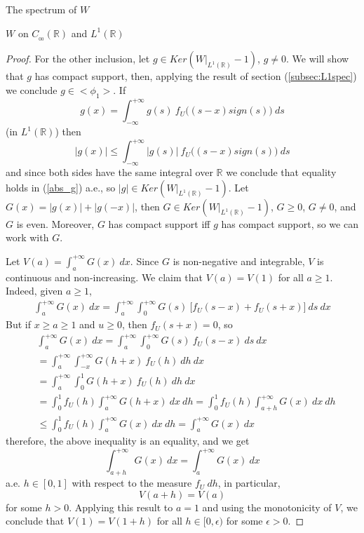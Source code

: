 \documentclass[12pt]{article}
\begin{document}
\begin{section}{The spectrum of $W$ }
\begin{subsection}{$W$ on $C_{_{0\!0}}(\mathbb{R})$ and $L^1(\mathbb{R})$}
\begin{proof}
For the other inclusion, let $g \in Ker\left( W\Big|_{L^1(\mathbb{R})} - 1 \right) $, $g \ne 0$. We will show that $g$ has compact support, then, applying the result of section (\ref{subsec:L1spec}) we conclude $g \in <\phi_1>$. If
\begin{equation} \label{eq:1eigen_g}
g(x) = \int_{-\infty}^{+\infty} g(s) \ f_U\!\Big( (s-x)sign(s) \Big) \ ds
\end{equation}
(in $L^1(\mathbb{R})$) then
\begin{equation} \label{eq:abs_g}
|g(x)| \le \int_{-\infty}^{+\infty} |g(s)| \ f_U\!\Big( (s-x)sign(s) \Big) \ ds
\end{equation}
and since both sides have the same integral over $\mathbb{R}$ we conclude that equality holds in (\ref{abs_g}) a.e., so $|g| \in Ker\left( W\Big|_{L^1(\mathbb{R})} - 1 \right) $. Let $G(x) = |g(x)| + |g(-x)|$, then $G \in Ker\left( W\Big|_{L^1(\mathbb{R})} - 1 \right) $, $G \ge 0$, $G \ne 0$, and $G$ is even. Moreover, $G$ has compact support iff $g$ has compact support, so we can work with $G$. 

Let $V(a) = \int_{a}^{+\infty} G(x) \ dx$. Since $G$ is non-negative and integrable, $V$ is continuous and non-increasing. We claim that $V(a) = V(1)$ for all $a \ge 1$. Indeed, given $a \ge 1$,
\begin{align*}
\int_{a}^{+\infty} G(x) \ dx = 
\int_{a}^{+\infty} \int_{0}^{+\infty} G(s) \ \Big[ f_U(s-x) + f_U(s+x) \Big] \ ds \ dx
\end{align*}
But if $x \ge a \ge 1$ and $u \ge 0$, then $f_U(s+x) = 0$, so
\begin{align*}
&\int_{a}^{+\infty} G(x) \ dx = 
\int_{a}^{+\infty} \int_{0}^{+\infty} G(s) \  f_U(s-x)  \ ds \ dx \\
&=\int_{a}^{+\infty} \int_{-x}^{+\infty}  G(h+x) \ f_U(h)  \ dh \ dx \\
&=\int_{a}^{+\infty} \int_{0}^{1}  G(h+x) \ f_U(h)  \ dh \ dx \\
&=\int_{0}^{1} f_U(h) \int_{a}^{+\infty}  G(h+x) \ dx \ dh =
\int_{0}^{1} f_U(h) \int_{a+h}^{+\infty}  G(x) \ dx \ dh \\
& \le \int_{0}^{1} f_U(h) \int_{a}^{+\infty}  G(x) \ dx \ dh = \int_{a}^{+\infty}  G(x) \ dx
\end{align*}
therefore, the above inequality is an equality, and we get
$$
\int_{a+h}^{+\infty}  G(x) \ dx =  \int_{a}^{+\infty}  G(x) \ dx 
$$
a.e. $h \in [0,1]$ with respect to the measure $f_U \ dh$, in particular,
$$
V(a+h) = V(a) 
$$
for some $h > 0$. Applying this result to $a=1$ and using the monotonicity of $V$, we conclude that $V(1)=V(1+h)$ for all $h \in [0,\epsilon)$ for some $\epsilon > 0$.  


\end{proof}
\end{subsection}
\end{section}
\end{document}
